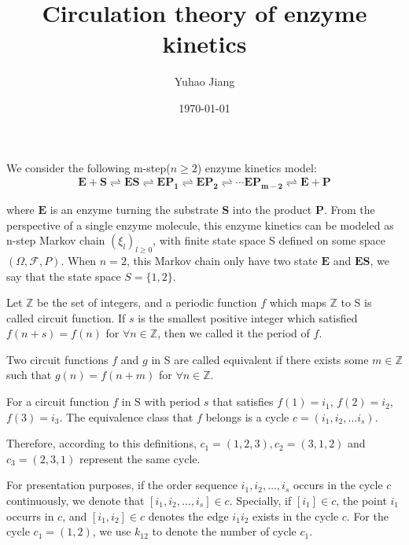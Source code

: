 \documentclass[11pt,en,cite=authoryear]{elegantpaper}
\title{Circulation theory of enzyme kinetics}
\author{Yuhao Jiang}
\date{\today}
\begin{document}
\maketitle
We consider the following m-step($n\ge 2$) enzyme kinetics model:
\begin{align} \label{eq:model}
    \bm{E + S \rightleftharpoons
    ES \rightleftharpoons
    EP_1 \rightleftharpoons
    EP_2 \rightleftharpoons
    \cdots
    EP_{m-2} \rightleftharpoons
    E + P}
\end{align}

where $\bm{E}$ is an enzyme turning the substrate $\bm{S}$ into the product $\bm{P}$. From the  perspective of a single enzyme molecule, this enzyme kinetics can be modeled as n-step Markov chain $(\xi_l)_{l\ge 0}$, with finite state space S defined on some space $(\Omega, \mathcal{F}, P)$. When $n=2$, this Markov chain only have two state $\bm{E}$ and $\bm{ES}$, we say that the state space $S=\{1, 2\}$.

\begin{definition}
    Let $\mathbb{Z}$ be the set of integers, and a periodic function $f$ which maps $\mathbb{Z}$ to S is called circuit function. If $s$ is the smallest positive integer which satisfied $f(n+s) = f(n)$ for $\forall n \in \mathbb{Z}$, then we called it the period of $f$.
\end{definition}

\begin{definition}
    Two circuit functions $f$ and $g$ in S are called equivalent if there exists some $m \in \mathbb{Z}$ such that $g(n) = f(n+m)$ for $\forall n \in \mathbb{Z}$.
\end{definition}
\begin{definition}
    For a circuit function $f$ in S with period $s$ that satisfies $f(1)=i_1$, $f(2)=i_2$, $f(3)=i_3$. The equivalence class that $f$ belongs is a cycle $c=(i_1, i_2, \dots i_s)$.
\end{definition}

Therefore, according to this definitions, $c_1 = (1, 2, 3), c_2 = (3, 1, 2)$ and $c_3 = (2, 3, 1)$ represent the same cycle. 

For presentation purposes, if the order sequence $i_1, i_2, \dots, i_s$ occurs in the cycle $c$ continuously, we denote that $[i_1, i_2, \dots, i_s] \in c$. Specially, if $[i_1] \in c$, the point $i_1$ occurrs in $c$, and $[i_1, i_2] \in c$ denotes the edge $i_1 i_2$ exists in the cycle $c$. 
For the cycle $c_1 = (1,2)$, we use $k_{12}$ to denote the number of cycle $c_1$.
\end{document}
